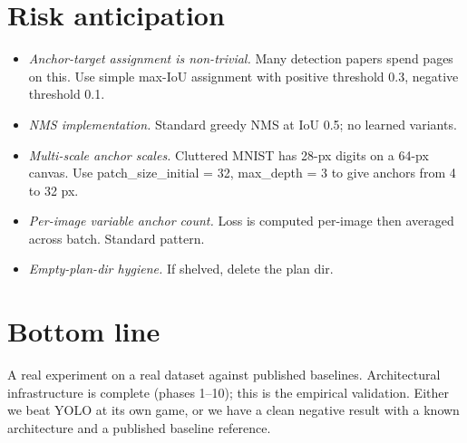\documentclass[11pt,a4paper]{article}
\begin{document}
\section{Risk anticipation}

\begin{itemize}
\item \emph{Anchor-target assignment is non-trivial.} Many detection
  papers spend pages on this. Use simple max-IoU assignment with
  positive threshold 0.3, negative threshold 0.1.
\item \emph{NMS implementation.} Standard greedy NMS at IoU 0.5;
  no learned variants.
\item \emph{Multi-scale anchor scales.} Cluttered MNIST has 28-px
  digits on a 64-px canvas. Use patch\_size\_initial = 32,
  max\_depth = 3 to give anchors from 4 to 32 px.
\item \emph{Per-image variable anchor count.} Loss is computed
  per-image then averaged across batch. Standard pattern.
\item \emph{Empty-plan-dir hygiene.} If shelved, delete the plan dir.
\end{itemize}

\section{Bottom line}

A real experiment on a real dataset against published baselines.
Architectural infrastructure is complete (phases 1--10); this is
the empirical validation. Either we beat YOLO at its own game,
or we have a clean negative result with a known architecture and
a published baseline reference.
\end{document}
